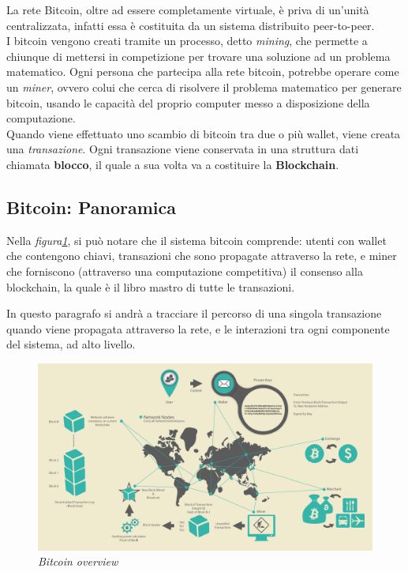 La rete Bitcoin, oltre ad essere completamente virtuale, è priva di un'unità centralizzata, infatti essa è costituita da un sistema distribuito peer-to-peer.\\
I bitcoin vengono creati tramite un processo, detto \textit{mining}, che permette a chiunque di mettersi in competizione per trovare una soluzione ad un problema matematico. Ogni persona che partecipa alla rete bitcoin, potrebbe operare come un \textit{miner}, ovvero colui che cerca di risolvere il problema matematico per generare bitcoin, usando le capacità del proprio computer messo a disposizione della computazione.\cite{antonopoulos2014mastering}\\

Quando viene effettuato uno scambio di bitcoin tra due o più wallet, viene creata una \textit{transazione}. Ogni transazione viene conservata in una struttura dati chiamata \textbf{blocco}, il quale a sua volta va a costituire la \textbf{Blockchain}.

\subsection{Bitcoin: Panoramica}

Nella \textit{figura\ref{fig:overview}}, si può notare che il sistema bitcoin comprende: utenti con wallet che contengono chiavi, transazioni che sono propagate attraverso la rete, e miner che forniscono (attraverso una computazione competitiva) il consenso alla blockchain, la quale è il libro mastro di tutte le transazioni. 

In questo paragrafo si andrà a tracciare il percorso di una singola transazione quando viene propagata attraverso la rete, e le interazioni tra ogni componente del sistema, ad alto livello.

\begin{figure}[h]
	\centering
	\includegraphics[width= \linewidth]{figure/overview}
	\caption{\textit{Bitcoin overview} \label{fig:overview}}
\end{figure}

